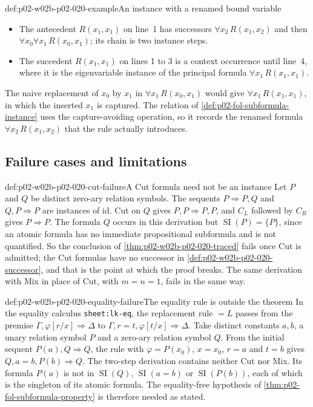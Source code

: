 \begin{hbexample}{def:p02-w02b-p02-020-example}{An instance with a renamed bound variable}
\begin{itemize}
        \(x_2\) occurs nowhere in the endsequent.
  \item The antecedent \(R(x_1,x_1)\) on line~1 has successors
        \(\forall x_2\,R(x_1,x_2)\) and then
        \(\forall x_0\forall x_1\,R(x_0,x_1)\); its chain is two instance steps.
  \item The succedent \(R(x_1,x_1)\) on lines 1 to 3 is a context occurrence
        until line~4, where it is the eigenvariable instance of the principal
        formula \(\forall x_1\,R(x_1,x_1)\).
\end{itemize}
The naive replacement of \(x_0\) by \(x_1\) in \(\forall x_1\,R(x_0,x_1)\)
would give \(\forall x_1\,R(x_1,x_1)\), in which the inserted \(x_1\) is
captured.  The relation of \cref{def:p02-fol-subformula-instance} uses the
capture-avoiding operation, so it records the renamed formula
\(\forall x_2\,R(x_1,x_2)\) that the rule actually introduces.
\end{hbexample}

\subsection{Failure cases and limitations}
\label{sec:p02-w02b-p02-020-limits}

\begin{hbwarning}{def:p02-w02b-p02-020-cut-failure}{A Cut formula need not be an instance}
Let \(P\) and \(Q\) be distinct zero-ary relation symbols.  The sequents
\(P\Rightarrow P,Q\) and \(Q,P\Rightarrow P\) are instances of
\(\mathrm{id}\).  Cut on \(Q\) gives \(P,P\Rightarrow P,P\), and \(C_L\)
followed by \(C_R\) gives \(P\Rightarrow P\).  The formula \(Q\) occurs in this
derivation but \(\operatorname{SI}(P)=\{P\}\), since an atomic formula has no
immediate propositional subformula and is not quantified.  So the conclusion of
\cref{thm:p02-w02b-p02-020-traced} fails once Cut is admitted; the Cut
formulas have no successor in \cref{def:p02-w02b-p02-020-successor}, and that
is the point at which the proof breaks.  The same derivation with Mix in place
of Cut, with \(m=n=1\), fails in the same way.
\end{hbwarning}

\begin{hbwarning}{def:p02-w02b-p02-020-equality-failure}{The equality rule is outside the theorem}
In the equality calculus \texttt{sheet:lk-eq}, the replacement rule \(=L\)
passes from the premise \(\Gamma,\varphi[r/x]\Rightarrow\Delta\) to
\(\Gamma,r=t,\varphi[t/x]\Rightarrow\Delta\).  Take distinct constants \(a,b\),
a unary relation symbol \(P\) and a zero-ary relation symbol \(Q\).  From the
initial sequent \(P(a),Q\Rightarrow Q\), the rule with \(\varphi=P(x_0)\),
\(x=x_0\), \(r=a\) and \(t=b\) gives \(Q,a=b,P(b)\Rightarrow Q\).  The two-step derivation
contains neither Cut nor Mix.  Its formula \(P(a)\) is not in
\(\operatorname{SI}(Q)\), \(\operatorname{SI}(a=b)\) or
\(\operatorname{SI}(P(b))\), each of which is the singleton of its atomic
formula.  The equality-free hypothesis of
\cref{thm:p02-fol-subformula-property} is therefore needed as stated.
\end{hbwarning}

